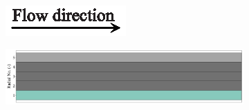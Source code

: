 \documentclass[preprint,12pt]{elsarticle}
\begin{document}
\begin{figure}
     \centering
     \begin{subfigure}[b]{\textwidth}
     	\includegraphics[width=\textwidth]{flow_dir.eps}
     \end{subfigure}
     \begin{subfigure}[b]{0.85\textwidth}
\includegraphics[width=\textwidth]{results/segments/5seg/40C60T/seg.png}
     \end{subfigure}
     \hfill
     \begin{subfigure}[b]{0.1\textwidth}

\end{subfigure}
\end{figure}
\end{document}
